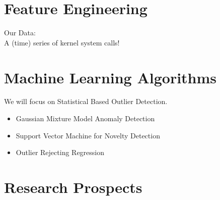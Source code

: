 \documentclass{beamer}
\begin{document}
\section{Feature Engineering}
\frame
{Our Data:\\
A (time) series of kernel system calls!

}


\section{Machine Learning Algorithms}
\frame
{
We will focus on Statistical Based Outlier Detection.
\begin{itemize}
\item Gaussian Mixture Model Anomaly Detection\cite{out2}
\item Support Vector Machine for Novelty Detection\cite{out3}
\item Outlier Rejecting Regression\cite{out6}
\end{itemize}
}

\section{Research Prospects}
\end{document}
